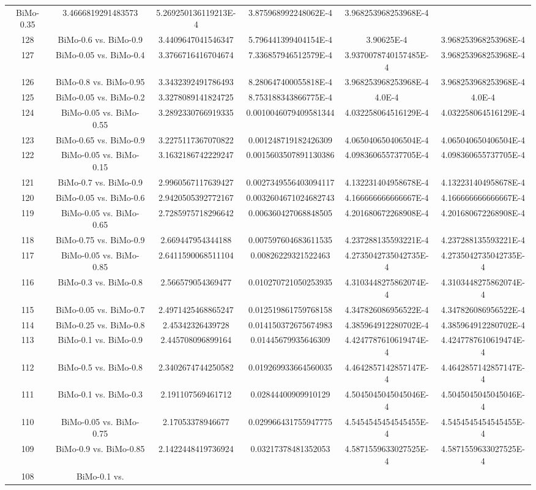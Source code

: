\documentclass[a4paper,10pt]{article}
\begin{document}
\begin{landscape}
\begin{table}[!htp]
\begin{tabular}{cccccc}
BiMo-0.35&3.4666819291483573&5.269250136119213E-4&3.875968992248062E-4&3.968253968253968E-4\\128&BiMo-0.6 vs. BiMo-0.9&3.4409647041546347&5.796441399404154E-4&3.90625E-4&3.968253968253968E-4\\127&BiMo-0.05 vs. BiMo-0.4&3.3766716416704674&7.336857946512579E-4&3.9370078740157485E-4&3.968253968253968E-4\\126&BiMo-0.8 vs. BiMo-0.95&3.3432392491786493&8.280647400055818E-4&3.968253968253968E-4&3.968253968253968E-4\\125&BiMo-0.05 vs. BiMo-0.2&3.3278089141824725&8.753188343866775E-4&4.0E-4&4.0E-4\\124&BiMo-0.05 vs. BiMo-0.55&3.2892330766919335&0.0010046079409581344&4.032258064516129E-4&4.032258064516129E-4\\123&BiMo-0.65 vs. BiMo-0.9&3.2275117367070822&0.001248719182426309&4.065040650406504E-4&4.065040650406504E-4\\122&BiMo-0.05 vs. BiMo-0.15&3.1632186742229247&0.0015603507891130386&4.098360655737705E-4&4.098360655737705E-4\\121&BiMo-0.7 vs. BiMo-0.9&2.9960567117639427&0.0027349556403094117&4.132231404958678E-4&4.132231404958678E-4\\120&BiMo-0.05 vs. BiMo-0.6&2.9420505392772167&0.0032604671024682743&4.166666666666667E-4&4.166666666666667E-4\\119&BiMo-0.05 vs. BiMo-0.65&2.7285975718296642&0.006360427068848505&4.201680672268908E-4&4.201680672268908E-4\\118&BiMo-0.75 vs. BiMo-0.9&2.669447954344188&0.007597604683611535&4.237288135593221E-4&4.237288135593221E-4\\117&BiMo-0.05 vs. BiMo-0.85&2.6411590068511104&0.00826229321522463&4.2735042735042735E-4&4.2735042735042735E-4\\116&BiMo-0.3 vs. BiMo-0.8&2.566579054369477&0.010270721050253935&4.3103448275862074E-4&4.3103448275862074E-4\\115&BiMo-0.05 vs. BiMo-0.7&2.4971425468865247&0.012519861759768158&4.347826086956522E-4&4.347826086956522E-4\\114&BiMo-0.25 vs. BiMo-0.8&2.45342326439728&0.014150372675674983&4.385964912280702E-4&4.385964912280702E-4\\113&BiMo-0.1 vs. BiMo-0.9&2.445708096899164&0.01445679935646309&4.4247787610619474E-4&4.4247787610619474E-4\\112&BiMo-0.5 vs. BiMo-0.8&2.3402674744250582&0.019269933664560035&4.4642857142857147E-4&4.4642857142857147E-4\\111&BiMo-0.1 vs. BiMo-0.3&2.191107569461712&0.02844400909910129&4.5045045045045046E-4&4.5045045045045046E-4\\110&BiMo-0.05 vs. BiMo-0.75&2.17053378946677&0.029966431755947775&4.5454545454545455E-4&4.5454545454545455E-4\\109&BiMo-0.9 vs. BiMo-0.85&2.1422448419736924&0.03217378481352053&4.5871559633027525E-4&4.5871559633027525E-4\\108&BiMo-0.1 vs. 
\end{tabular}
\end{table}
\end{landscape}
\end{document}
